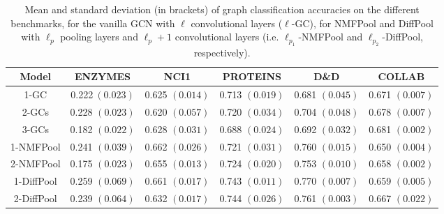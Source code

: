 \documentclass[runningheads]{llncs}
\begin{document}
\begin{table}
\caption{Mean and standard deviation (in brackets) of graph classification accuracies on the different benchmarks, for the vanilla GCN with $\ell$ convolutional layers ($\ell$-GC), for NMFPool and DiffPool with $\ell_p$ pooling layers and $\ell_p+1$ convolutional layers (i.e. $\ell_{p_1}$-NMFPool and $\ell_{p_2}$-DiffPool, respectively).}\label{table-acc}
\begin{tabular}{cccccc} \toprule[1.5pt]
    {\bfseries{Model}} & {\bfseries{ENZYMES}} & {\bfseries{NCI1}} & {\bfseries{PROTEINS}} & {\bfseries{D\&D}} & {\bfseries{COLLAB}} \\ \midrule
    {1-GC} &  0.222$~\left(0.023\right)$ & 0.625 $\left(0.014\right)$ & 0.713 $\left(0.019\right)$ & 0.681 $ \left(0.045\right)$ & 0.671 $\left(0.007\right)$ \\
    {2-GCs}  & 0.228 $\left(0.023\right)$  & 0.620 $\left(0.057\right)$ & 0.720 $\left(0.034\right)$ & 0.704 $ \left(0.048\right)$ & 0.678 $\left(0.007\right)$   \\
    {3-GCs}  & 0.182 $\left(0.022\right)$ & 0.628 $\left(0.031\right)$ & 0.688 $\left(0.024\right)$  & 0.692 $\left(0.032\right)$ & 0.681 $\left(0.002\right)$ \\ \midrule
    {1-NMFPool}  & 0.241 $\left(0.039\right)$   & 0.662 $\left(0.026\right)$  & 0.721 $\left(0.031\right)$  & 0.760 $\left(0.015\right)$ & 0.650 $\left(0.004\right)$ \\
    {2-NMFPool}  & 0.175 $\left(0.023\right)$  & 0.655 $\left(0.013\right)$ & 0.724 $\left(0.020\right)$  & 0.753 $\left(0.010\right)$ & 0.658 $\left(0.002\right)$  \\ \midrule
    {1-DiffPool}  & 0.259 $\left(0.069\right)$   & 0.661 $\left(0.017\right)$  & 0.743 $\left(0.011\right)$ & 0.770 $\left(0.007\right)$ & 0.659 $\left(0.005\right)$ \\
    {2-DiffPool} & 0.239 $\left(0.064\right)$   & 0.632 $\left(0.017\right)$ & 0.744 $\left(0.026\right)$   & 0.761 $\left(0.003\right)$ & 0.667 $\left(0.022\right)$  \\ \bottomrule[1.5pt]
\end{tabular}
\end{table}
\end{document}
